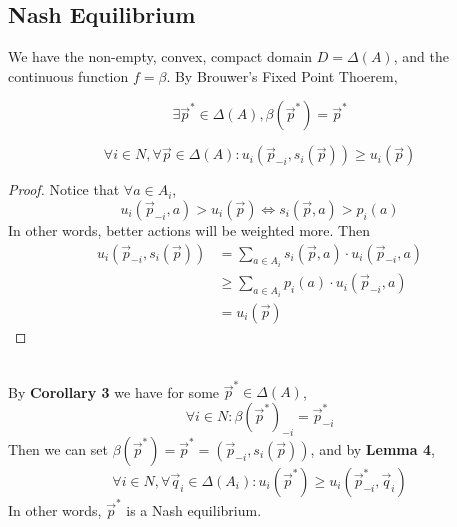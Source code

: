 \newpage
\subsection{Nash Equilibrium}

We have the non-empty, convex, compact domain $D=\Delta(A)$,
and the continuous function $f=\beta$.
By Brouwer's Fixed Point Thoerem,
\begin{corollary}
    \[\exists \vec{p}^*\in\Delta(A), \beta(\vec{p}^*)=\vec{p}^*\]
\end{corollary}
\begin{lemma}
    \[\forall i\in N,\forall \vec{p}\in\Delta(A) : 
    u_i(\vec{p}_{-i},s_i(\vec{p})) \geq u_i(\vec{p})\]
\end{lemma}
\begin{proof}
    Notice that $\forall a\in A_i$,
    \[u_i(\vec{p}_{-i},a) > u_i(\vec{p}) \Leftrightarrow 
    s_i(\vec{p},a) > p_i(a)\]
    In other words, better actions will be weighted more. Then 
    \begin{equation}
    \begin{aligned}
    u_i(\vec{p}_{-i},s_i(\vec{p})) 
    &= \sum_{a\in A_i} s_i(\vec{p},a)\cdot u_i(\vec{p}_{-i},a)\\
    &\geq \sum_{a\in A_i} p_i(a)\cdot u_i(\vec{p}_{-i},a)\\
    &= u_i(\vec{p})
    \end{aligned}
    \end{equation}
\end{proof}\\
By \textbf{Corollary 3} we have for some $\vec{p}^*\in\Delta(A)$,
\[\forall i\in N : \beta(\vec{p}^*)_{-i}=\vec{p}_{-i}^*\]
Then we can set $\beta(\vec{p}^*)=\vec{p}^*
=(\vec{p}_{-i},s_i(\vec{p}))$, and by \textbf{Lemma 4},
\[\forall i\in N, \forall \vec{q}_i\in\Delta(A_i) :
u_i(\vec{p}^*)\geq u_i(\vec{p}_{-i}^*,\vec{q}_i)\]
In other words, $\vec{p}^*$ is a Nash equilibrium.



